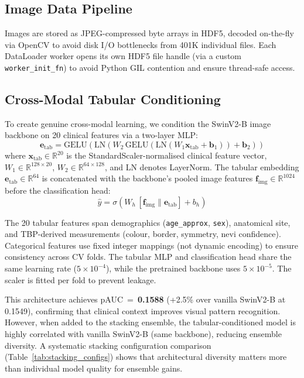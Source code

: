 \documentclass[conference]{IEEEtran}
\begin{document}
\subsection{Image Data Pipeline}

Images are stored as JPEG-compressed byte arrays in HDF5, decoded
on-the-fly via OpenCV to avoid disk I/O bottlenecks from 401K
individual files. Each DataLoader worker opens its own HDF5 file
handle (via a custom \texttt{worker\_init\_fn}) to avoid Python GIL
contention and ensure thread-safe access.

\subsection{Cross-Modal Tabular Conditioning}
\label{sec:tabcond}

To create genuine cross-modal learning, we condition the SwinV2-B
image backbone on 20 clinical features via a two-layer MLP:
\begin{equation}
  \mathbf{e}_{\text{tab}} = \text{GELU}\!\left(
    \text{LN}\!\left(W_2\,\text{GELU}\!\left(
      \text{LN}\!\left(W_1\mathbf{x}_{\text{tab}} + \mathbf{b}_1\right)
    \right) + \mathbf{b}_2\right)
  \right)
  \label{eq:tab_embed}
\end{equation}
where $\mathbf{x}_{\text{tab}} \in \mathbb{R}^{20}$ is the
StandardScaler-normalised clinical feature vector,
$W_1 \in \mathbb{R}^{128 \times 20}$, $W_2 \in \mathbb{R}^{64 \times 128}$,
and LN denotes LayerNorm. The tabular embedding
$\mathbf{e}_{\text{tab}} \in \mathbb{R}^{64}$ is concatenated with
the backbone's pooled image features
$\mathbf{f}_{\text{img}} \in \mathbb{R}^{1024}$ before the
classification head:
\begin{equation}
  \hat{y} = \sigma\!\left(
    W_h\,[\mathbf{f}_{\text{img}} \| \mathbf{e}_{\text{tab}}] + b_h
  \right)
  \label{eq:fusion}
\end{equation}

The 20 tabular features span demographics (\texttt{age\_approx},
\texttt{sex}), anatomical site, and TBP-derived measurements
(colour, border, symmetry, nevi confidence).
Categorical features use fixed integer mappings (not dynamic encoding)
to ensure consistency across CV folds.
The tabular MLP and classification head share the same learning rate
($5\times 10^{-4}$), while the pretrained backbone uses $5\times 10^{-5}$.
The scaler is fitted per fold to prevent leakage.

This architecture achieves pAUC~=~\textbf{0.1588} (+2.5\% over
vanilla SwinV2-B at 0.1549), confirming that clinical context
improves visual pattern recognition.
However, when added to the stacking ensemble, the tabular-conditioned
model is highly correlated with vanilla SwinV2-B (same backbone),
reducing ensemble diversity.
A systematic stacking configuration comparison
(Table~\ref{tab:stacking_configs}) shows that architectural diversity
matters more than individual model quality for ensemble gains.
\end{document}
